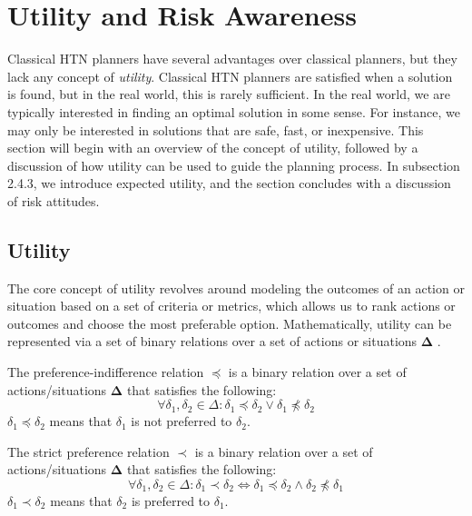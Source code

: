 \section{Utility and Risk Awareness}
\label{sec:utilityAnRisk}

Classical HTN planners have several advantages over classical planners, but they lack any concept of \textit{utility}. Classical HTN planners are satisfied when a solution is found, but in the real world, this is rarely sufficient. In the real world, we are typically interested in finding an optimal solution in some sense. For instance, we may only be interested in solutions that are safe, fast, or inexpensive. This section will begin with an overview of the concept of utility, followed by a discussion of how utility can be used to guide the planning process. In subsection 2.4.3, we introduce expected utility, and the section concludes with a discussion of risk attitudes.

\subsection{Utility}
The core concept of utility revolves around modeling the outcomes of an action or situation based on a set of criteria or metrics, which allows us to rank actions or outcomes and choose the most preferable option. Mathematically, utility can be represented via a set of binary relations over a set of actions or situations $\mathbf{\Delta}$ \cite{fishburn1968utility}.

\begin{Tdef}
    The preference-indifference relation $\preceq$ is a binary relation over a set of actions/situations $\mathbf{\Delta}$ that satisfies the following:
    $$\forall \delta_1, \delta_2 \in \Delta : \delta_1 \preceq \delta_2 \vee \delta_1 \npreceq \delta_2$$
    $\delta_1 \preceq \delta_2$ means that $\delta_1$ is not preferred to $\delta_2$.
\end{Tdef}

\begin{Tdef}
    The strict preference relation $\prec$ is a binary relation over a set of actions/situations $\mathbf{\Delta}$ that satisfies the following:
    $$\forall \delta_1, \delta_2 \in \Delta : \delta_1 \prec \delta_2 \Longleftrightarrow \delta_1 \preceq \delta_2 \wedge \delta_2 \npreceq \delta_1$$
    $\delta_1 \prec \delta_2$ means that $\delta_2$ is preferred to $\delta_1$.
\end{Tdef}


